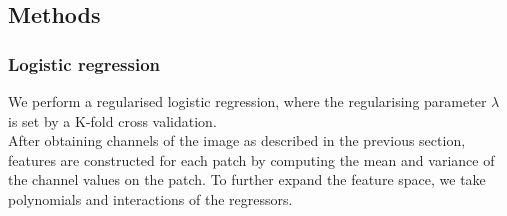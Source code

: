 \documentclass[%
 reprint,
 amsmath,amssymb,
 aps,
]{revtex4-1}
\begin{document}
\subsection{\label{sec:level2}Methods} 
\subsubsection{Logistic regression}
We perform a regularised logistic regression, where the regularising parameter $\lambda$ is set by a K-fold cross validation.\\
After obtaining channels of the image as described in the previous section, features are constructed for each patch by computing the mean and variance of the channel values on the patch. To further expand the feature space, we take polynomials and interactions of the regressors.
\end{document}
